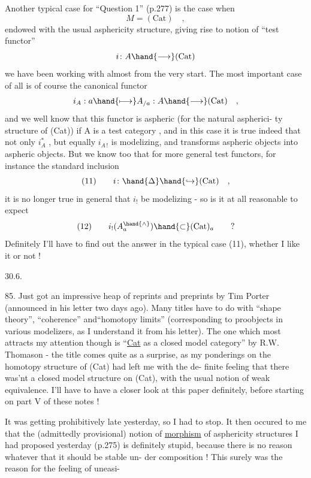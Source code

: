 
Another typical case for ``Question 1'' (p.277) is the case when
\[ M = (\mathrm{Cat}) \quad , \]
endowed with the usual asphericity structure, giving rise to  notion of
``test functor''
\[ i\colon A \hand{\longrightarrow} (\mathrm{Cat}) \]
we have been working with almost from the very start. The most important
case of all is of course the canonical functor
\[ i_A : a \hand{\longmapsto} A_{/a} : A \hand{\longrightarrow} (\mathrm{Cat}) \quad , \]
and we well know that this functor is aspheric (for the natural aspherici-%
ty structure of (Cat)) if A is a  test category , and in this case it
is true indeed that not only $i_A^{*}$ , but equally $i_{A\,!}$ is modelizing, and
transforms aspheric objects into aspheric objects. But we know too that
for more general test functors, for instance the standard inclusion
\[ (11) \qquad i\colon \hand{\Delta} \hand{\hookrightarrow} (\mathrm{Cat}) \quad , \]
it is no longer true in general that $i_!$ be modelizing - so is it at all
reasonable to expect
\[ (12) \qquad i_!(A^{\hand{\wedge}}_a) \hand{\subset} (\mathrm{Cat})_a \qquad ? \]
Definitely I'll have to find out the answer in the typical case (11),
whether I like it or not !


30.6.

85. Just got an impressive heap of reprints and preprints by Tim
Porter (announced in his letter two days ago). Many titles have to do
with ``shape theory'', ``coherence'' and``homotopy limits'' (corresponding to
proobjects in various modelizers, as I understand it from his letter).
The one which most attracts my attention though is ``\uline{Cat} as a closed model
category'' by R.W. Thomason - the title comes quite as a surprise, as
my ponderings on the homotopy structure of (Cat) had left me with the de-%
finite feeling that there was'nt a closed model structure on (Cat), with
the usual notion of weak equivalence. I'll have to  have a closer
 look at this paper definitely, before starting on part V of these notes !

It was getting prohibitively late yesterday, so I had to stop. It
then occured to me that the (admittedly provisional) notion of \uline{morphism}
of asphericity structures I had proposed yesterday (p.275) is definitely
stupid, because there is no reason whatever that it should be stable un-%
der composition ! This surely was the reason for the feeling of uneasi-%

